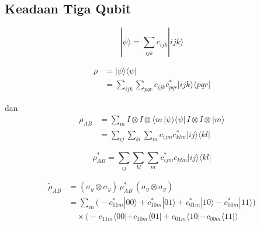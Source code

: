 \subsection{Keadaan Tiga Qubit}
\begin{equation}
	|\psi\rangle
	= \sum_{i j k} c_{i j k} | i j k \rangle
\end{equation}

\begin{equation}
	\begin{aligned}
		\rho
		&= |\psi\rangle \langle \psi| \\
		&= \sum_{i j k} \sum_{p q r}
		c_{i j k} c^{*}_{p q r}
		| i j k \rangle \langle p q r |
	\end{aligned}
\end{equation}

dan
\begin{equation}
	\begin{aligned}
		\rho_{AB}
		&= \sum_m I \otimes I \otimes \langle m 
		\, |\psi\rangle \langle \psi | \,
		I \otimes I \otimes | m \rangle \\
		&= \sum_{i j} \sum_{k l}\sum_m
		c_{i j m} c^{*}_{k l m}
		| i j \rangle \langle k l |
	\end{aligned}
\end{equation}

\begin{equation}
	\rho^{*}_{AB}
	= \sum_{i j} \sum_{k l} \sum_m
	c^{*}_{i j m} c_{k l m}
	| i j \rangle \langle k l |
\end{equation}

\begin{equation}
	\begin{aligned}
		\tilde{\rho}_{AB}
		&= (\sigma_y \otimes \sigma_y)\,
		\rho^{*}_{AB}\,
		(\sigma_y \otimes \sigma_y) \\
		&= \sum_m
		\Big(
		- c^{*}_{11m} |00\rangle
		+ c^{*}_{10m} |01\rangle
		+ c^{*}_{01m} |10\rangle
		- c^{*}_{00m} |11\rangle
		\Big) \\
		&\quad \times
		\Big(
		- c_{11m} \langle 00|
		+ c_{10m} \langle 01|
		+ c_{01m} \langle 10|
		- c_{00m} \langle 11|
		\Big)
	\end{aligned}
\end{equation}

